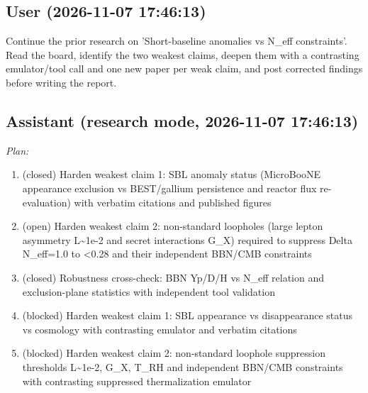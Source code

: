 \documentclass[11pt,a4paper]{article}
\begin{document}
\subsection*{User \small(2026-11-07 17:46:13)}
Continue the prior research on 'Short-baseline anomalies vs N\_eff constraints'. Read the board, identify the two weakest claims, deepen them with a contrasting emulator/tool call and one new paper per weak claim, and post corrected findings before writing the report.

\subsection*{Assistant \small(research mode, 2026-11-07 17:46:13)}
\textit{Plan:}\begin{enumerate}
  \item (closed) Harden weakest claim 1: SBL anomaly status (MicroBooNE appearance exclusion vs BEST/gallium persistence and reactor flux re-evaluation) with verbatim citations and published figures
  \item (open) Harden weakest claim 2: non-standard loopholes (large lepton asymmetry L\textasciitilde{}1e-2 and secret interactions G\_X) required to suppress Delta N\_eff=1.0 to \textless{}0.28 and their independent BBN/CMB constraints
  \item (closed) Robustness cross-check: BBN Yp/D/H vs N\_eff relation and exclusion-plane statistics with independent tool validation
  \item (blocked) Harden weakest claim 1: SBL appearance vs disappearance status vs cosmology with contrasting emulator and verbatim citations
  \item (blocked) Harden weakest claim 2: non-standard loophole suppression thresholds L\textasciitilde{}1e-2, G\_X, T\_RH and independent BBN/CMB constraints with contrasting suppressed thermalization emulator
\end{enumerate}
\end{document}
